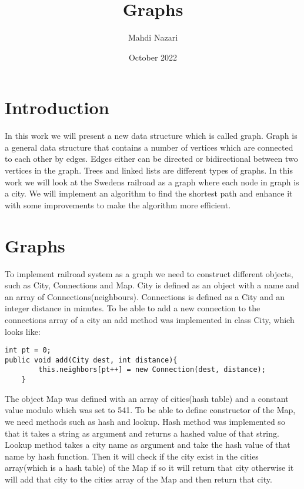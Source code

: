 \documentclass[a4paper,11pt]{article}
\begin{document}
\title{
    \textbf{Graphs}
}
\author{Mahdi Nazari}
\date{October 2022}

\maketitle

\section*{Introduction}
In this work we will present a new data structure which is called graph. Graph is a general data structure that contains a number of vertices which are connected to each other by edges. Edges either can be directed or bidirectional between two vertices  in the graph. Trees and linked lists are different types of graphs. In this work we will look at the Swedens railroad as a graph where each node in graph is a city. We will implement an algorithm to find the shortest path and enhance it with some improvements to make the algorithm more efficient.   

\section*{Graphs}
To implement railroad system as a graph we need to construct different objects, such as City, Connections and Map. City is defined as an object with a name and an array of Connections(neighbours). Connections is defined as a City and an integer distance in minutes. To be able to add a new connection to the connections array of a city an add method was implemented in class City, which looks like:
\begin{verbatim}
int pt = 0;
public void add(City dest, int distance){
        this.neighbors[pt++] = new Connection(dest, distance);
    }
\end{verbatim}   
The object Map was defined with an array of cities(hash table) and a constant value modulo which was set to 541. To be able to define constructor of the Map, we need methods such as hash and lookup. Hash method was implemented so that it takes a string as argument and returns a hashed value of that string. Lookup method takes a city name as argument and take the hash value of that name by hash function. Then it will check if the city exist in the cities array(which is a hash table) of the Map if so it will return that city otherwise it will add that city to the cities array of the Map and then return that city.\newline  
\end{document}
